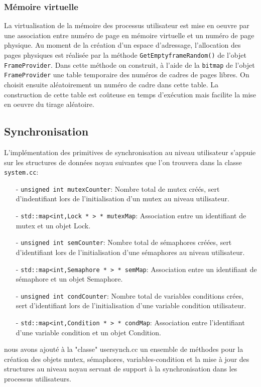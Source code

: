\documentclass[11pt]{article}
\theoremstyle{definition}
\theoremstyle{definition}
\begin{document}
\subsubsection{Mémoire virtuelle}
La virtualisation de la mémoire des processus utilisateur est mise en oeuvre par une association entre numéro
de page en mémoire virtuelle et un numéro de page physique. Au moment de la création d'un espace d'adressage, l'allocation des pages physiques est réalisée par la méthode \texttt{GetEmptyframeRandom()} de l'objet \texttt{FrameProvider}.
Dans cette méthode on construit, à l'aide de la \texttt{bitmap} de l'objet \texttt{FrameProvider} une table temporaire des numéros de cadres de pages libres.
On choisit ensuite aléatoirement un numéro de cadre dans cette table. La construction de cette table est coûteuse en temps d'exécution mais facilite la mise en oeuvre du tirage aléatoire.

\subsection{Synchronisation}
L'implémentation des primitives de synchronisation au niveau utilisateur s'appuie sur les structures de données noyau suivantes que l'on trouvera dans la classe \texttt{system.cc}:
\begin{itemize}
\item[-]\texttt{unsigned int mutexCounter}: Nombre total de mutex créés,
  sert d'indentifiant lors de l'initialisation d'un mutex au niveau utilisateur.
\item[-]\texttt{std::map<int,Lock * > * mutexMap}: Association entre un identifiant de mutex
  et un objet Lock.
\item[-]\texttt{unsigned int semCounter}: Nombre total de sémaphores créées,
  sert d'identifiant lors de l'initialisation d'une sémaphores au niveau utilisateur.
\item[-]\texttt{std::map<int,Semaphore * > * semMap}: Association entre un identifiant de sémaphore
  et un objet Semaphore.
\item[-]\texttt{unsigned int condCounter}: Nombre total de variables conditions crées, sert
  d'identifiant lors de l'initialisation d'une variable condition utilisateur.
\item[-]\texttt{std::map<int,Condition * > * condMap}: Association entre l'identifiant d'une variable condition et un objet Condition.
\end{itemize}
nous avons ajouté à la "classe" usersynch.cc un ensemble de méthodes pour la création des objets mutex, sémaphores, variables-condition et la mise à jour des structures au niveau noyau servant de support à la synchronisation dans les processus utilisateurs.
\end{document}
